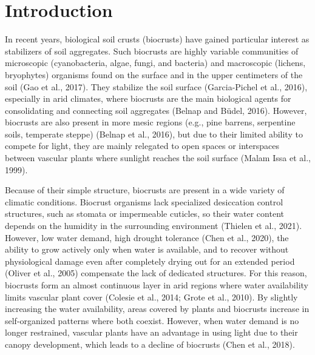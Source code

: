 \section{Introduction}
In recent years, biological soil crusts (biocrusts) have gained particular interest as stabilizers of soil aggregates. Such biocrusts are highly variable communities of microscopic (cyanobacteria, algae, fungi, and bacteria) and macroscopic (lichens, bryophytes) organisms found on the surface and in the upper centimeters of the soil (Gao et al., 2017). They stabilize the soil surface (Garcia-Pichel et al., 2016), especially in arid climates, where biocrusts are the main biological agents for consolidating and connecting soil aggregates (Belnap and Büdel, 2016). However, biocrusts are also present in more mesic regions (e.g., pine barrens, serpentine soils, temperate steppe) (Belnap et al., 2016), but due to their limited ability to compete for light, they are mainly relegated to open spaces or interspaces between vascular plants where sunlight reaches the soil surface (Malam Issa et al., 1999).

Because of their simple structure, biocrusts are present in a wide variety of climatic conditions. Biocrust organisms lack specialized desiccation control structures, such as stomata or impermeable cuticles, so their water content depends on the humidity in the surrounding environment (Thielen et al., 2021). However, low water demand, high drought tolerance (Chen et al., 2020), the ability to grow actively only when water is available, and to recover without physiological damage even after completely drying out for an extended period (Oliver et al., 2005) compensate the lack of dedicated structures. For this reason, biocrusts form an almost continuous layer in arid regions where water availability limits vascular plant cover (Colesie et al., 2014; Grote et al., 2010). By slightly increasing the water availability, areas covered by plants and biocrusts increase in self-organized patterns where both coexist. However, when water demand is no longer restrained, vascular plants have an advantage in using light due to their canopy development, which leads to a decline of biocrusts (Chen et al., 2018).


